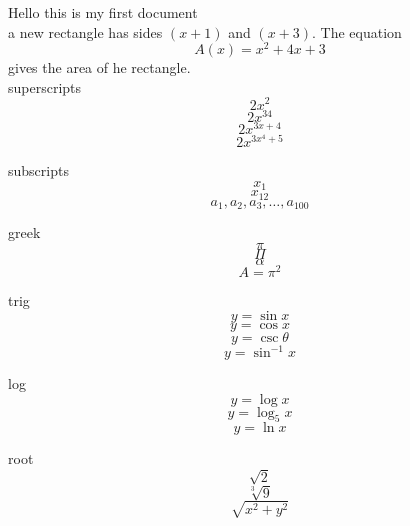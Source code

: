 \documentclass[18px]{article}
\begin{document}
Hello this is my first document\\

a new rectangle has sides $(x + 1)$ and $(x + 3)$.
The equation $${A(x) = x^2 + 4x + 3}$$ gives the area of he rectangle.\\


superscripts 
$$2x^2$$
$$2x^{34}$$
$$2x^{3x + 4}$$
$$2x^{3x^4 + 5}$$

subscripts
$$x_1$$
$$x_{12}$$
$$a_1, a_2, a_3, \ldots, a_{100}$$

greek
$$\pi$$
$$\Pi$$
$$\alpha$$
$$A = \pi ^2$$

trig
$$y = \sin x$$
$$y = \cos x$$
$$y = \csc \theta$$
$$y = \sin ^{-1} x$$

log
$$y = \log x$$
$$y = \log_5 x$$
$$y = \ln x $$

root
$$\sqrt{2}$$
$$\sqrt[3]{9}$$
$$\sqrt{x^2 + y^2}$$
\end{document}
